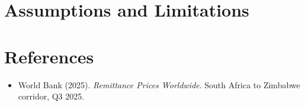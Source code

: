 \documentclass[11pt,a4paper]{article}
\begin{document}
\section{Assumptions and Limitations}\label{sec:assumptions}

\section*{References}
\begin{itemize}[leftmargin=1.5em, label={}]
  \item %
        World Bank (2025). \emph{Remittance Prices Worldwide}. South Africa to Zimbabwe corridor, Q3 2025.
\end{itemize}
\end{document}
